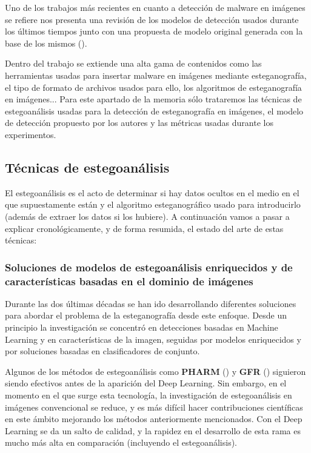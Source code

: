 Uno de los trabajos más recientes en cuanto a detección de malware en imágenes se refiere nos presenta una revisión de los modelos de detección usados durante los últimos tiempos junto con una propuesta de modelo original generada con la base de los mismos (\cite{stegomalware}). %

Dentro del trabajo se extiende una alta gama de contenidos como las herramientas usadas para insertar malware en imágenes mediante esteganografía, el tipo de formato de archivos usados para ello, los algoritmos de esteganografía en imágenes... Para este apartado de la memoria sólo trataremos las técnicas de estegoanálisis usadas para la detección de esteganografía en imágenes, el modelo de detección propuesto por los autores y las métricas usadas durante los experimentos.

\subsection{Técnicas de estegoanálisis}

El estegoanálisis es el acto de determinar si hay datos ocultos en el medio en el que supuestamente están y el algoritmo esteganográfico usado para introducirlo (además de extraer los datos si los hubiere). A continuación vamos a pasar a explicar cronológicamente, y de forma resumida, el estado del arte de estas técnicas:

\subsubsection{Soluciones de modelos de estegoanálisis enriquecidos y de características basadas en el dominio de imágenes}

Durante las dos últimas décadas se han ido desarrollando diferentes soluciones para abordar el problema de la esteganografía desde este enfoque. Desde un principio la investigación se concentró en detecciones basadas en Machine Learning y en características de la imagen, seguidas por modelos enriquecidos y por soluciones basadas en clasificadores de conjunto. 

Algunos de los métodos de estegoanálisis como \textbf{PHARM} (\cite{pharm}) y \textbf{GFR} (\cite{gfr}) siguieron siendo efectivos antes de la aparición del Deep Learning. Sin embargo, en el momento en el que surge esta tecnología, la investigación de estegoanálisis en imágenes convencional se reduce, y es más difícil hacer contribuciones científicas en este ámbito mejorando los métodos anteriormente mencionados. Con el Deep Learning se da un salto de calidad, y la rapidez en el desarrollo de esta rama es mucho más alta en comparación (incluyendo el estegoanálisis). %

